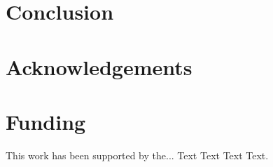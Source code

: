 \documentclass{bioinfo}
\begin{document}
\section{Conclusion}

\vspace*{-10pt}


\section*{Acknowledgements}

\vspace*{-12pt}

\section*{Funding}

This work has been supported by the... Text Text  Text Text.\vspace*{-12pt}

%
%
%
%
%
%
%
%

\end{document}
